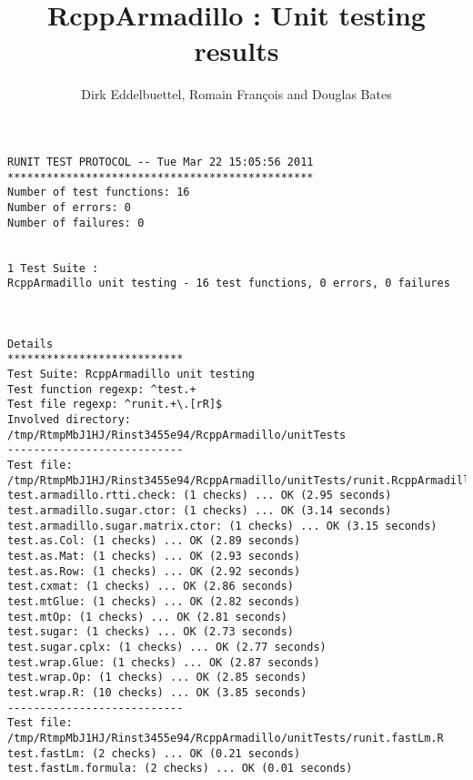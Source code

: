 \documentclass[10pt]{article}
\author{Dirk Eddelbuettel, Romain Fran\c{c}ois and Douglas Bates}
\title{RcppArmadillo : Unit testing results}
\begin{document}
\maketitle

\begin{verbatim}
RUNIT TEST PROTOCOL -- Tue Mar 22 15:05:56 2011 
*********************************************** 
Number of test functions: 16 
Number of errors: 0 
Number of failures: 0 

 
1 Test Suite : 
RcppArmadillo unit testing - 16 test functions, 0 errors, 0 failures



Details 
*************************** 
Test Suite: RcppArmadillo unit testing 
Test function regexp: ^test.+ 
Test file regexp: ^runit.+\.[rR]$ 
Involved directory: 
/tmp/RtmpMbJ1HJ/Rinst3455e94/RcppArmadillo/unitTests 
--------------------------- 
Test file: /tmp/RtmpMbJ1HJ/Rinst3455e94/RcppArmadillo/unitTests/runit.RcppArmadillo.R 
test.armadillo.rtti.check: (1 checks) ... OK (2.95 seconds)
test.armadillo.sugar.ctor: (1 checks) ... OK (3.14 seconds)
test.armadillo.sugar.matrix.ctor: (1 checks) ... OK (3.15 seconds)
test.as.Col: (1 checks) ... OK (2.89 seconds)
test.as.Mat: (1 checks) ... OK (2.93 seconds)
test.as.Row: (1 checks) ... OK (2.92 seconds)
test.cxmat: (1 checks) ... OK (2.86 seconds)
test.mtGlue: (1 checks) ... OK (2.82 seconds)
test.mtOp: (1 checks) ... OK (2.81 seconds)
test.sugar: (1 checks) ... OK (2.73 seconds)
test.sugar.cplx: (1 checks) ... OK (2.77 seconds)
test.wrap.Glue: (1 checks) ... OK (2.87 seconds)
test.wrap.Op: (1 checks) ... OK (2.85 seconds)
test.wrap.R: (10 checks) ... OK (3.85 seconds)
--------------------------- 
Test file: /tmp/RtmpMbJ1HJ/Rinst3455e94/RcppArmadillo/unitTests/runit.fastLm.R 
test.fastLm: (2 checks) ... OK (0.21 seconds)
test.fastLm.formula: (2 checks) ... OK (0.01 seconds)\end{verbatim}
\end{document}
